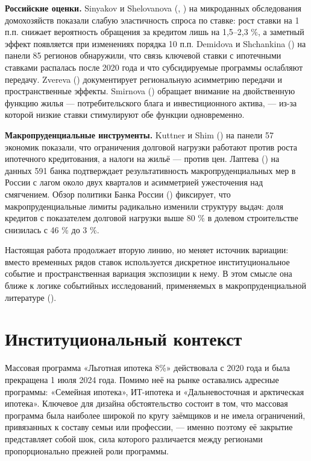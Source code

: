 \documentclass[
  russian,
  11pt,
]{article}
\begin{document}
\textbf{Российские оценки.} Sinyakov и Shelovanova
(, ) на микроданных обследования домохозяйств показали слабую
эластичность спроса по ставке: рост ставки на 1 п.п. снижает вероятность
обращения за кредитом лишь на 1,5--2,3 \%, а заметный эффект появляется
при изменениях порядка 10 п.п. Demidova и Shchankina
() на панели 85 регионов обнаружили,
что связь ключевой ставки с ипотечными ставками распалась после 2020
года и что субсидируемые программы ослабляют передачу. Zvereva
() документирует региональную
асимметрию передачи и пространственные эффекты. Smirnova
() обращает внимание на двойственную
функцию жилья --- потребительского блага и инвестиционного актива, ---
из-за которой низкие ставки стимулируют обе функции одновременно.

\textbf{Макропруденциальные инструменты.} Kuttner и Shim
() на панели 57 экономик показали,
что ограничения долговой нагрузки работают против роста ипотечного
кредитования, а налоги на жильё --- против цен. Лаптева
() на данных 591 банка подтверждает
результативность макропруденциальных мер в России с лагом около двух
кварталов и асимметрией ужесточения над смягчением. Обзор политики Банка
России () фиксирует, что
макропруденциальные лимиты радикально изменили структуру выдач: доля
кредитов с показателем долговой нагрузки выше 80 \% в долевом
строительстве снизилась с 46 \% до 3 \%.

Настоящая работа продолжает вторую линию, но меняет источник вариации:
вместо временных рядов ставок используется дискретное институциональное
событие и пространственная вариация экспозиции к нему. В этом смысле она
ближе к логике событийных исследований, применяемых в
макропруденциальной литературе ().

\section{Институциональный
контекст}\label{ux438ux43dux441ux442ux438ux442ux443ux446ux438ux43eux43dux430ux43bux44cux43dux44bux439-ux43aux43eux43dux442ux435ux43aux441ux442}

Массовая программа «Льготная ипотека 8\%» действовала с 2020 года и была
прекращена 1 июля 2024 года. Помимо неё на рынке оставались адресные
программы: «Семейная ипотека», ИТ-ипотека и «Дальневосточная и
арктическая ипотека». Ключевое для дизайна обстоятельство состоит в том,
что массовая программа была наиболее широкой по кругу заёмщиков и не
имела ограничений, привязанных к составу семьи или профессии, --- именно
поэтому её закрытие представляет собой шок, сила которого различается
между регионами пропорционально прежней роли программы.
\end{document}
